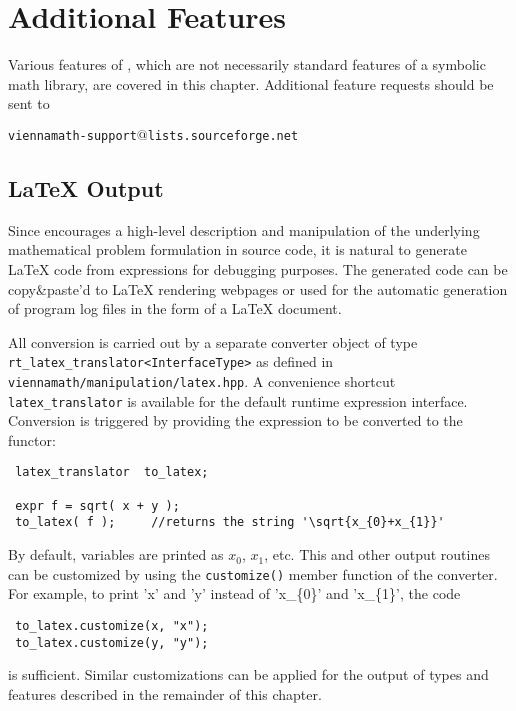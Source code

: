 
\chapter{Additional Features}
Various features of {\ViennaMath}, which are not necessarily standard features of a symbolic math library, are covered in this chapter.
Additional feature requests should be sent to
\begin{center}
\texttt{viennamath-support$@$lists.sourceforge.net} 
\end{center}

  \section{\LaTeX{} Output}
Since {\ViennaMath} encourages a high-level description and manipulation of the underlying mathematical problem formulation in source code, it is natural to
generate \LaTeX{} code from {\ViennaMath} expressions for debugging purposes. The generated code can be copy\&paste'd to LaTeX rendering webpages or used for
the automatic generation of program log files in the form of a \LaTeX{} document.

All conversion is carried out by a separate converter object of type \lstinline|rt_latex_translator<InterfaceType>| as defined in
\lstinline|viennamath/manipulation/latex.hpp|. A convenience shortcut \lstinline|latex_translator| is available for the default runtime expression interface.
Conversion is triggered by providing the expression to be converted to the functor:
\begin{lstlisting}
 latex_translator  to_latex;

 expr f = sqrt( x + y );
 to_latex( f );     //returns the string '\sqrt{x_{0}+x_{1}}'
\end{lstlisting}
By default, variables are printed as $x_0$, $x_1$, etc. This and other output routines can be customized by using the \lstinline|customize()| member function
of the converter. For example, to print 'x' and 'y' instead of 'x\_\{0\}' and 'x\_\{1\}', the code
\begin{lstlisting}
 to_latex.customize(x, "x");
 to_latex.customize(y, "y");
\end{lstlisting}
is sufficient. Similar customizations can be applied for the output of types and features described in the remainder of this chapter.


